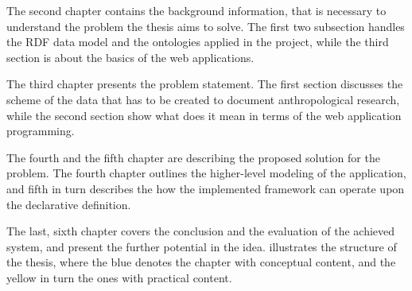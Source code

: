 The second chapter contains the background information, that is necessary to understand the problem the thesis aims to solve. The first two subsection handles the RDF data model and the ontologies applied in the project, while the third section is about the basics of the web applications.

The third chapter presents the problem statement. The first section discusses the scheme of the data that has to be created to document anthropological research, while the second section show what does it mean in terms of the web application programming. 

The fourth and the fifth chapter are describing the proposed solution for the problem. The fourth chapter outlines the higher-level modeling of the application, and fifth in turn describes the how the implemented framework can operate upon the declarative definition.

The last, sixth chapter covers the conclusion and the evaluation of the achieved system, and present the further potential in the idea.  illustrates the structure of the thesis, where the blue denotes the chapter with conceptual content, and the yellow in turn the ones with practical content.




